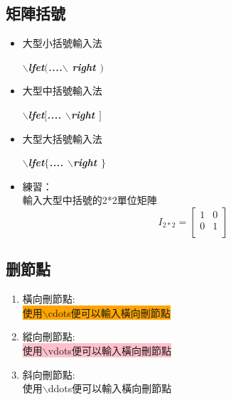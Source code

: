 \subsection{矩陣括號}
\begin{itemize}
\item 大型小括號輸入法
\begin{center}
\emph{\textbf{$\backslash$lfet$($....$\backslash$ right $)$}}
\end{center}
\item 大型中括號輸入法
\begin{center}
\emph{\textbf{$\backslash$lfet$[$.... $\backslash$right $]$}}
\end{center}
\item 大型大括號輸入法
\begin{center}
\emph{\textbf{$\backslash$lfet$\{$.... $\backslash$right $\}$}}
\end{center}
\item 練習：\\
輸入大型中括號的2*2單位矩陣
        $$ I_{2*2} = \left[
            \begin{array}{lr}
                1 & 0\\
                0 & 1\\
            \end{array} \right] $$

\end{itemize}
\subsection{删節點} 
\begin{enumerate}
\item \textcolor{green!10!blue!90!}{橫向刪節點:}\\
\colorbox{orange}{使用$\backslash$cdots便可以輸入橫向刪節點}
\item \textcolor{green!10!red!90!}{縱向刪節點:}\\
\colorbox{pink}{使用$\backslash$vdots便可以輸入橫向刪節點}
\item \textcolor{green!10!orange!90!}{斜向刪節點:}\\
\colorbox{alizarin}{使用$\backslash$ddots便可以輸入橫向刪節點}
\end{enumerate}
\newpage
